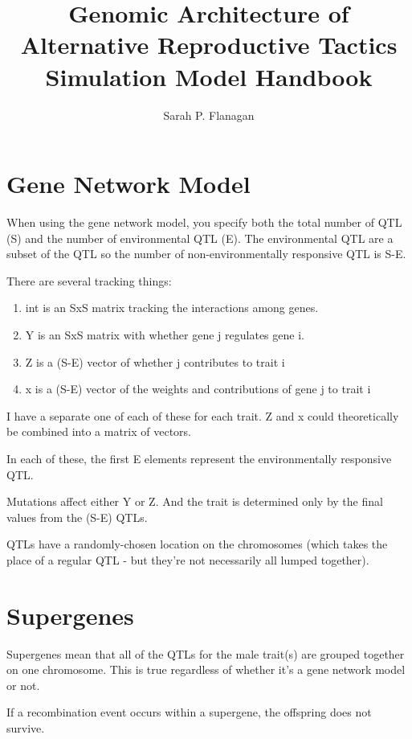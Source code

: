 \documentclass[]{article}
\title{Genomic Architecture of Alternative Reproductive Tactics Simulation Model Handbook}
\author{Sarah P. Flanagan}
\begin{document}
\maketitle

\begin{abstract}

\end{abstract}

\section{Gene Network Model}
When using the gene network model, you specify both the total number of QTL (S) and the number of environmental QTL (E). The environmental QTL are a subset of the QTL so the number of non-environmentally responsive QTL is S-E.

There are several tracking things:

\begin{enumerate}
	\item int is an SxS matrix tracking the interactions among genes.
	\item Y is an SxS matrix with whether gene j regulates gene i.
	\item Z is a (S-E) vector of whether j contributes to trait i
	\item x is a (S-E) vector of the weights and contributions of gene j to trait i
\end{enumerate}

I have a separate one of each of these for each trait. Z and x could theoretically be combined into a matrix of vectors.

In each of these, the first E elements represent the environmentally responsive QTL.

Mutations affect either Y or Z. And the trait is determined only by the final values from the (S-E) QTLs.

QTLs have a randomly-chosen location on the chromosomes (which takes the place of a regular QTL - but they're not necessarily all lumped together).

\section{Supergenes}
Supergenes mean that all of the QTLs for the male trait(s) are grouped together on one chromosome. This is true regardless of whether it's a gene network model or not.

If a recombination event occurs within a supergene, the offspring does not survive. 
\end{document}
